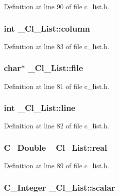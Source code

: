 Definition at line 90 of file c\_\-list.h.
\subsubsection{\setlength{\rightskip}{0pt plus 5cm}int \bf{\_\-Cl\_\-List::column}}\label{struct__Cl__List_aa18f651b6ad4c6edef09533719d726a}




Definition at line 83 of file c\_\-list.h.
\subsubsection{\setlength{\rightskip}{0pt plus 5cm}char$\ast$ \bf{\_\-Cl\_\-List::file}}\label{struct__Cl__List_c0af64c33db2cd0dd5de0990853d3e19}




Definition at line 81 of file c\_\-list.h.
\subsubsection{\setlength{\rightskip}{0pt plus 5cm}int \bf{\_\-Cl\_\-List::line}}\label{struct__Cl__List_5026a42b55f85d3eb291d47d927c2290}




Definition at line 82 of file c\_\-list.h.
\subsubsection{\setlength{\rightskip}{0pt plus 5cm}\bf{C\_\-Double} \bf{\_\-Cl\_\-List::real}}\label{struct__Cl__List_6f671c93fb0112ac5048c879f0e278ce}




Definition at line 89 of file c\_\-list.h.
\subsubsection{\setlength{\rightskip}{0pt plus 5cm}\bf{C\_\-Integer} \bf{\_\-Cl\_\-List::scalar}}\label{struct__Cl__List_a1da38865a3f48456b24e870e441e5cb}




